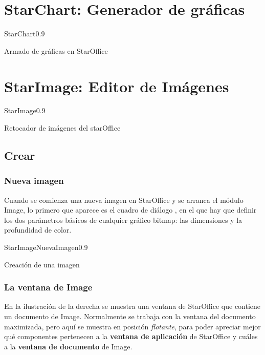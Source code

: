 \section{StarChart: Generador de gráficas}
\begin{figura}{StarChart}{0.9}
\caption{Armado de gráficas en StarOffice}
\end{figura}

\section{StarImage: Editor de Imágenes}
\begin{figura}{StarImage}{0.9}
\caption{Retocador de imágenes del starOffice}
\end{figura}



\subsection{Crear}
\subsubsection{Nueva imagen}

Cuando se comienza una nueva imagen en StarOffice y se arranca el módulo Image, lo primero
que aparece es el cuadro de diálogo , en el que hay que definir los dos parámetros
básicos de cualquier gráfico bitmap: las dimensiones y la profundidad de color.

\begin{figura}{StarImageNuevaImagen}{0.9}
\caption{Creación de una imagen}
\label{fig:StarImageNuevaImagen}
\end{figura}


\subsubsection{La ventana de Image}
En la ilustración de la derecha se muestra una ventana de StarOffice que contiene un
documento de Image. Normalmente se trabaja con la ventana del documento maximizada, pero aquí 
se muestra en posición {\it flotante}, para poder apreciar mejor qué componentes pertenecen a la
\textbf{ventana de aplicación} de StarOffice y cuáles a la \textbf{ventana de documento} de Image.


